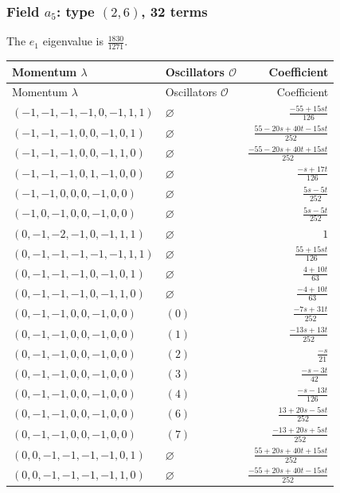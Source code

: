 \subsubsection{\texorpdfstring{Field $a_{5}$: type $(2,6)$, 32 terms}{Field a5: type (2,6), 32 terms}}
The $e_1$ eigenvalue is $\frac{1830}{1271}$. 
\begingroup\scriptsize\setlength{\tabcolsep}{3pt}\renewcommand{\arraystretch}{1.35}
\begin{longtable}{@{}llr@{}}
\toprule Momentum $\lambda$&Oscillators $\mathcal O$&Coefficient\\\midrule\endfirsthead
\toprule Momentum $\lambda$&Oscillators $\mathcal O$&Coefficient\\\midrule\endhead
\bottomrule\endfoot
$(-1,-1,-1,-1,0,-1,1,1)$ & $\varnothing$ & $\frac{-55+15st}{126}$\\
$(-1,-1,-1,0,0,-1,0,1)$ & $\varnothing$ & $\frac{55-20s+40t-15st}{252}$\\
$(-1,-1,-1,0,0,-1,1,0)$ & $\varnothing$ & $\frac{-55-20s+40t+15st}{252}$\\
$(-1,-1,-1,0,1,-1,0,0)$ & $\varnothing$ & $\frac{-s+17t}{126}$\\
$(-1,-1,0,0,0,-1,0,0)$ & $\varnothing$ & $\frac{5s-5t}{252}$\\
$(-1,0,-1,0,0,-1,0,0)$ & $\varnothing$ & $\frac{5s-5t}{252}$\\
$(0,-1,-2,-1,0,-1,1,1)$ & $\varnothing$ & $1$\\
$(0,-1,-1,-1,-1,-1,1,1)$ & $\varnothing$ & $\frac{55+15st}{126}$\\
$(0,-1,-1,-1,0,-1,0,1)$ & $\varnothing$ & $\frac{4+10t}{63}$\\
$(0,-1,-1,-1,0,-1,1,0)$ & $\varnothing$ & $\frac{-4+10t}{63}$\\
$(0,-1,-1,0,0,-1,0,0)$ & $(0)$ & $\frac{-7s+31t}{252}$\\
$(0,-1,-1,0,0,-1,0,0)$ & $(1)$ & $\frac{-13s+13t}{252}$\\
$(0,-1,-1,0,0,-1,0,0)$ & $(2)$ & $\frac{-s}{21}$\\
$(0,-1,-1,0,0,-1,0,0)$ & $(3)$ & $\frac{-s-3t}{42}$\\
$(0,-1,-1,0,0,-1,0,0)$ & $(4)$ & $\frac{-s-13t}{126}$\\
$(0,-1,-1,0,0,-1,0,0)$ & $(6)$ & $\frac{13+20s-5st}{252}$\\
$(0,-1,-1,0,0,-1,0,0)$ & $(7)$ & $\frac{-13+20s+5st}{252}$\\
$(0,0,-1,-1,-1,-1,0,1)$ & $\varnothing$ & $\frac{55+20s+40t+15st}{252}$\\
$(0,0,-1,-1,-1,-1,1,0)$ & $\varnothing$ & $\frac{-55+20s+40t-15st}{252}$\\

\end{longtable}
